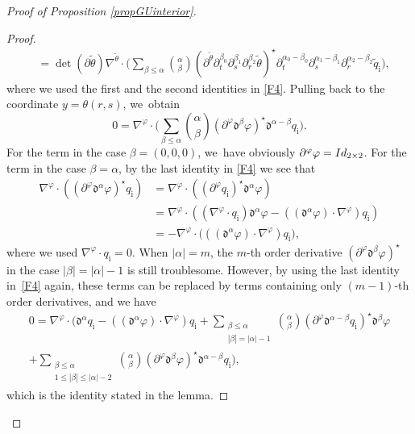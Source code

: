 \documentclass[11pt]{article}
\newcommand{\dt}{\partial_t}
\theoremstyle{definition}
\begin{document}
\begin{proof}[Proof of Proposition \ref{propGUinterior}]
\begin{proof}
\begin{align*}
&= \det(\partial\tilde{\theta})\nabla^{\tilde{\theta}}\cdot\biggl(\sum_{\beta\leq\alpha} \binom{\alpha}{\beta}
(\partial^{\tilde{\theta}}\dt^{\beta_0}\partial_s^{\beta_1}\partial_r^{\beta_2}\tilde{\theta})^\star
\dt^{\alpha_0-\beta_0}\partial_s^{\alpha_1-\beta_1}\partial_r^{\alpha_2-\beta_2}\tilde{q}_\mathrm{i} \biggr),
\end{align*}
where we used the first and the second identities in \eqref{F4}.
Pulling back to the coordinate $y=\theta(r,s)$, we~obtain
\[
0 = \nabla^\varphi\cdot\biggl(\sum_{\beta\leq\alpha} \binom{\alpha}{\beta}
(\partial^\varphi\mathfrak{d}^{\beta}\varphi)^\star \mathfrak{d}^{\alpha-\beta} q_\mathrm{i} \biggr).
\]
For the term in the case $\beta=(0,0,0)$, we~have obviously $\partial^\varphi\varphi={\rm Id}_{2\times2}$.
For the term in the case $\beta=\alpha$, by the last identity in \eqref{F4} we see that
\begin{align*}
\nabla^\varphi\cdot((\partial^\varphi\mathfrak{d}^{\alpha}\varphi)^\star q_\mathrm{i})
&= \nabla^\varphi\cdot ((\partial^\varphi q_\mathrm{i})^\star\mathfrak{d}^{\alpha}\varphi) \\
&= \nabla^\varphi\cdot ((\nabla^\varphi\cdot q_\mathrm{i})\mathfrak{d}^{\alpha}\varphi - ((\mathfrak{d}^{\alpha}\varphi)\cdot\nabla^\varphi)q_\mathrm{i}) \\
&= -\nabla^\varphi\cdot \bigl(((\mathfrak{d}^{\alpha}\varphi)\cdot\nabla^\varphi)q_\mathrm{i} \bigr),
\end{align*}
where we used $\nabla^\varphi\cdot q_\mathrm{i}=0$.
When $|\alpha|=m$, the $m$-th order derivative $(\partial^\varphi\mathfrak{d}^{\beta}\varphi)^\star$ in the case $|\beta|=|\alpha|-1$ is still troublesome.
However, by using the last identity in~\eqref{F4} again, these terms can be replaced by terms containing only $(m-1)$-th order derivatives,
and we have
\begin{multline*}
0 = \nabla^\varphi\cdot\biggl(\mathfrak{d}^{\alpha} q_\mathrm{i} - ((\mathfrak{d}^{\alpha}\varphi)\cdot\nabla^\varphi)q_\mathrm{i}
+ \sum_{\substack{\beta\leq\alpha\\ |\beta|=|\alpha|-1}}\binom{\alpha}{\beta} (\partial^\varphi\mathfrak{d}^{\alpha-\beta} q_\mathrm{i})^\star \mathfrak{d}^{\beta}\varphi \\[-10pt]
+ \sum_{\substack{\beta\leq\alpha\\ 1 \leq |\beta| \leq |\alpha|-2}} \binom{\alpha}{\beta}
(\partial^\varphi\mathfrak{d}^{\beta}\varphi)^\star \mathfrak{d}^{\alpha-\beta} q_\mathrm{i} \biggr),
\end{multline*}
which is the identity stated in the lemma.
\end{proof}


\end{proof}
\end{document}
